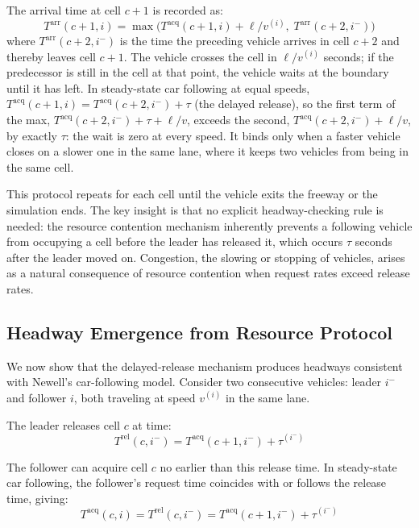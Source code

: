 \documentclass[review,authoryear]{elsarticle}
\newcommand{\Tacq}{T^{\text{acq}}}
\newcommand{\Tarr}{T^{\text{arr}}}
\newcommand{\Trel}{T^{\text{rel}}}
\begin{document}
The arrival time at cell $c+1$ is recorded as:
\begin{equation}
    \Tarr(c+1, i) = \max\!\big(\Tacq(c+1, i) + \ell / v^{(i)},\; \Tarr(c+2, i^{-})\big)
    \label{eq:arrival}
\end{equation}
where $\Tarr(c+2, i^{-})$ is the time the preceding vehicle arrives in cell $c+2$ and thereby leaves cell $c+1$. The vehicle crosses the cell in $\ell / v^{(i)}$ seconds; if the predecessor is still in the cell at that point, the vehicle waits at the boundary until it has left. In steady-state car following at equal speeds, $\Tacq(c+1, i) = \Tacq(c+2, i^{-}) + \tau$ (the delayed release), so the first term of the max, $\Tacq(c+2, i^{-}) + \tau + \ell/v$, exceeds the second, $\Tacq(c+2, i^{-}) + \ell/v$, by exactly $\tau$: the wait is zero at every speed. It binds only when a faster vehicle closes on a slower one in the same lane, where it keeps two vehicles from being in the same cell.

This protocol repeats for each cell until the vehicle exits the freeway or the simulation ends. The key insight is that no explicit headway-checking rule is needed: the resource contention mechanism inherently prevents a following vehicle from occupying a cell before the leader has released it, which occurs $\tau$ seconds after the leader moved on. Congestion, the slowing or stopping of vehicles, arises as a natural consequence of resource contention when request rates exceed release rates.

\subsection{Headway Emergence from Resource Protocol}
\label{sec:headway}

We now show that the delayed-release mechanism produces headways consistent with Newell's car-following model. Consider two consecutive vehicles: leader $i^{-}$ and follower $i$, both traveling at speed $v^{(i)}$ in the same lane.

The leader releases cell $c$ at time:
\begin{equation}
    \Trel(c, i^{-}) = \Tacq(c+1, i^{-}) + \tau^{(i^{-})}
\end{equation}

The follower can acquire cell $c$ no earlier than this release time. In steady-state car following, the follower's request time coincides with or follows the release time, giving:
\begin{equation}
    \Tacq(c, i) = \Trel(c, i^{-}) = \Tacq(c+1, i^{-}) + \tau^{(i^{-})}
\end{equation}
\end{document}
